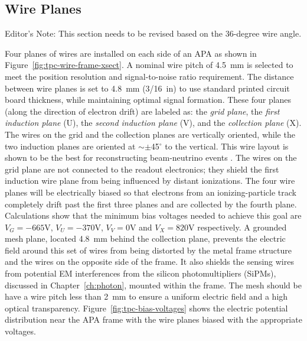 \subsection{Wire Planes}

\begin{editornote}
Editor's Note: This section needs to be revised based on the 36-degree wire angle.  
\end{editornote}

Four planes of wires are installed on each side of an APA as shown in Figure~\ref{fig:tpc-wire-frame-xsect}.
A nominal wire pitch of 4.5~mm is selected to meet the position resolution  and signal-to-noise ratio requirement. The distance between wire planes is set to 4.8~mm (3/16~in) to use standard printed circuit board thickness, while maintaining optimal signal formation.  These four planes (along the direction of electron drift) are labeled as: the {\em grid plane}, the {\em first induction plane} (U), the {\em second induction plane} (V), and the {\em collection plane} (X).
The wires on the grid and the collection planes
are vertically oriented, while the two induction planes are oriented 
at $\sim\pm$45$^\circ$ to the vertical. This wire layout is shown to be the best for reconstructing beam-neutrino events \cite{wire-orientation}. The wires on the grid plane are not 
connected to the readout electronics; they shield the first induction wire plane from being influenced by distant ionizations. The four wire planes 
will be electrically biased so that electrons from an ionizing-particle
track completely drift past the first three planes and are collected by the 
fourth plane. Calculations show that the minimum bias voltages 
needed to achieve this goal are $V_G= -665$V, $V_U=-370$V, $V_V=0$V and $V_X=820$V 
respectively.  A grounded mesh plane, located 4.8~mm behind the collection plane, prevents the electric field around this set of wires from being distorted by the metal frame structure and the wires on the opposite side of the frame. It also shields the sensing wires from potential EM interferences from the silicon photomultipliers (SiPMs), discussed in Chapter~\ref{ch:photon}, mounted within the frame.  The mesh should be have a wire pitch less than 2~mm to ensure a uniform electric field and a high optical transparency.  Figure~\ref{fig:tpc-bias-voltages} shows the electric potential distribution near the APA frame with the wire planes biased with the appropriate voltages. 

